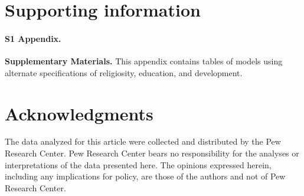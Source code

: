 \documentclass[10pt,letterpaper]{article}
\begin{document}
\section*{Supporting information}

\paragraph*{S1 Appendix.}
\label{S1_Appendix}
{\bf Supplementary Materials.}  This appendix contains tables of models using alternate specifications of religiosity, education, and development.

\section*{Acknowledgments}
The data analyzed for this article were collected and distributed by the Pew Research Center. Pew Research Center bears no responsibility for the analyses or interpretations of the data presented here. The opinions expressed herein, including any implications for policy, are those of the authors and not of Pew Research Center.

\nolinenumbers
\end{document}
